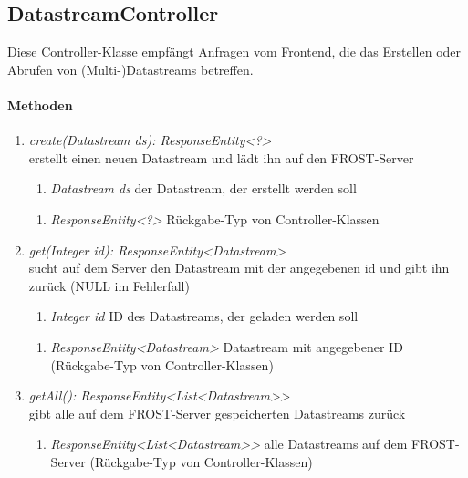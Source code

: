 \subsection{DatastreamController}
Diese Controller-Klasse empfängt Anfragen vom Frontend, die das Erstellen oder Abrufen von (Multi-)Datastreams betreffen.


\paragraph{Methoden}

\begin{enumerate}[+]
	\item \textit{ create(Datastream ds): ResponseEntity<?> }\\
	erstellt einen neuen Datastream und lädt ihn auf den FROST-Server
	
	\begin{enumerate}[$\bullet$]
		\item \textit{Datastream ds} der Datastream, der erstellt werden soll
		
	\end{enumerate}
	\vspace{-0.2cm}
	\begin{enumerate}[$\circ$]
		\item \textit{ResponseEntity<?>} Rückgabe-Typ von Controller-Klassen
	\end{enumerate}
	
	\item \textit{ get(Integer id): ResponseEntity<Datastream> }\\
	sucht auf dem Server den Datastream mit der angegebenen id und gibt ihn zurück (NULL im Fehlerfall)
	
	\begin{enumerate}[$\bullet$]
		\item \textit{Integer id} ID des Datastreams, der geladen werden soll
		
	\end{enumerate}
	\vspace{-0.2cm}
	\begin{enumerate}[$\circ$]
		\item \textit{ResponseEntity<Datastream>} Datastream mit angegebener ID (Rückgabe-Typ von Controller-Klassen)
	\end{enumerate}
	\item \textit{ getAll(): ResponseEntity<List<Datastream>> }\\
	gibt alle auf dem FROST-Server gespeicherten Datastreams zurück
	
	\begin{enumerate}[$\circ$]
		\item \textit{ResponseEntity<List<Datastream>>} alle Datastreams auf dem FROST-Server (Rückgabe-Typ von Controller-Klassen)
	\end{enumerate}
	
	
\end{enumerate}	